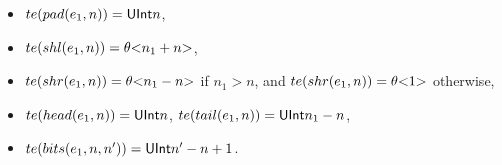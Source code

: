 {\begin{itemize}
\begin{itemize}
\item $te(pad(e_1, n)) = {\sf UInt}{n}$,
%
\item $te(shl(e_1,n)) = \theta \mbox{<} n_1 + n \mbox{>}$,
%
\item $te(shr(e_1, n)) = \theta \mbox{<} n_1-n \mbox{>}$ if $n_1 > n$, and $te(shr(e_1, n)) =  \theta \mbox{<} 1 \mbox{>}$ otherwise,
%
\item $te(head(e_1, n)) = {\sf UInt}{n}$, $te(tail(e_1, n)) = {\sf UInt}{n_1-n}$,
%
\item $te(bits(e_1, n, n')) = {\sf UInt}{n'-n+1}$.
\end{itemize}
%
\end{itemize}
}

